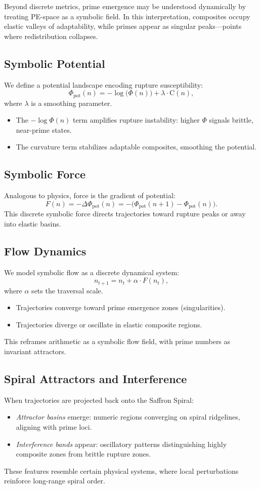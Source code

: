 \documentclass[11pt]{article}
\theoremstyle{plain}
\theoremstyle{definition}
\newcommand{\curv}{\mathrm{C}}                              %
\newcommand{\phidet}{\Phi}                                  %
\begin{document}
Beyond discrete metrics, prime emergence may be understood dynamically by treating PE-space as a symbolic field. In this interpretation, composites occupy elastic valleys of adaptability, while primes appear as singular peaks—points where redistribution collapses.

\subsection{Symbolic Potential}
We define a potential landscape encoding rupture susceptibility:
\[
\Phi_{\text{pot}}(n) = -\log\!\bigl(\phidet(n)\bigr) + \lambda \cdot \curv(n),
\]
where $\lambda$ is a smoothing parameter.  
\begin{itemize}
  \item The $-\log\!\phidet(n)$ term amplifies rupture instability: higher $\phidet$ signals brittle, near-prime states.  
  \item The curvature term stabilizes adaptable composites, smoothing the potential.  
\end{itemize}

\subsection{Symbolic Force}
Analogous to physics, force is the gradient of potential:
\[
F(n) = -\Delta \Phi_{\text{pot}}(n) = -\bigl(\Phi_{\text{pot}}(n+1) - \Phi_{\text{pot}}(n)\bigr).
\]
This discrete symbolic force directs trajectories toward rupture peaks or away into elastic basins.

\subsection{Flow Dynamics}
We model symbolic flow as a discrete dynamical system:
\[
n_{t+1} = n_t + \alpha \cdot F(n_t),
\]
where $\alpha$ sets the traversal scale.  
\begin{itemize}
  \item Trajectories converge toward prime emergence zones (singularities).  
  \item Trajectories diverge or oscillate in elastic composite regions.  
\end{itemize}
This reframes arithmetic as a symbolic flow field, with prime numbers as invariant attractors.

\subsection{Spiral Attractors and Interference}
When trajectories are projected back onto the Saffron Spiral:
\begin{itemize}
  \item \emph{Attractor basins} emerge: numeric regions converging on spiral ridgelines, aligning with prime loci.  
  \item \emph{Interference bands} appear: oscillatory patterns distinguishing highly composite zones from brittle rupture zones.  
\end{itemize}
These features resemble certain physical systems, where local perturbations reinforce long-range spiral order.
\end{document}
